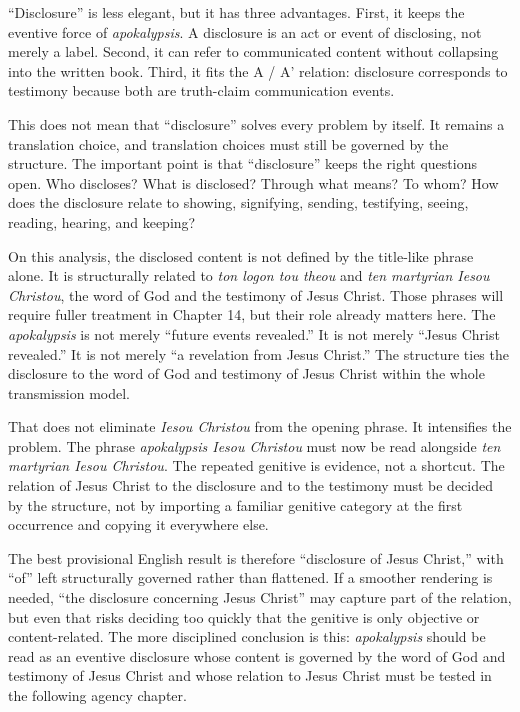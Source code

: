 ``Disclosure'' is less elegant, but it has three advantages. First, it keeps the eventive force of \textit{apokalypsis}. A disclosure is an act or event of disclosing, not merely a label. Second, it can refer to communicated content without collapsing into the written book. Third, it fits the A / A' relation: disclosure corresponds to testimony because both are truth-claim communication events.

This does not mean that ``disclosure'' solves every problem by itself. It remains a translation choice, and translation choices must still be governed by the structure. The important point is that ``disclosure'' keeps the right questions open. Who discloses? What is disclosed? Through what means? To whom? How does the disclosure relate to showing, signifying, sending, testifying, seeing, reading, hearing, and keeping?

On this analysis, the disclosed content is not defined by the title-like phrase alone. It is structurally related to \textit{ton logon tou theou} and \textit{ten martyrian Iesou Christou}, the word of God and the testimony of Jesus Christ. Those phrases will require fuller treatment in Chapter 14, but their role already matters here. The \textit{apokalypsis} is not merely ``future events revealed.'' It is not merely ``Jesus Christ revealed.'' It is not merely ``a revelation from Jesus Christ.'' The structure ties the disclosure to the word of God and testimony of Jesus Christ within the whole transmission model.

That does not eliminate \textit{Iesou Christou} from the opening phrase. It intensifies the problem. The phrase \textit{apokalypsis Iesou Christou} must now be read alongside \textit{ten martyrian Iesou Christou}. The repeated genitive is evidence, not a shortcut. The relation of Jesus Christ to the disclosure and to the testimony must be decided by the structure, not by importing a familiar genitive category at the first occurrence and copying it everywhere else.

The best provisional English result is therefore ``disclosure of Jesus Christ,'' with ``of'' left structurally governed rather than flattened. If a smoother rendering is needed, ``the disclosure concerning Jesus Christ'' may capture part of the relation, but even that risks deciding too quickly that the genitive is only objective or content-related. The more disciplined conclusion is this: \textit{apokalypsis} should be read as an eventive disclosure whose content is governed by the word of God and testimony of Jesus Christ and whose relation to Jesus Christ must be tested in the following agency chapter.

